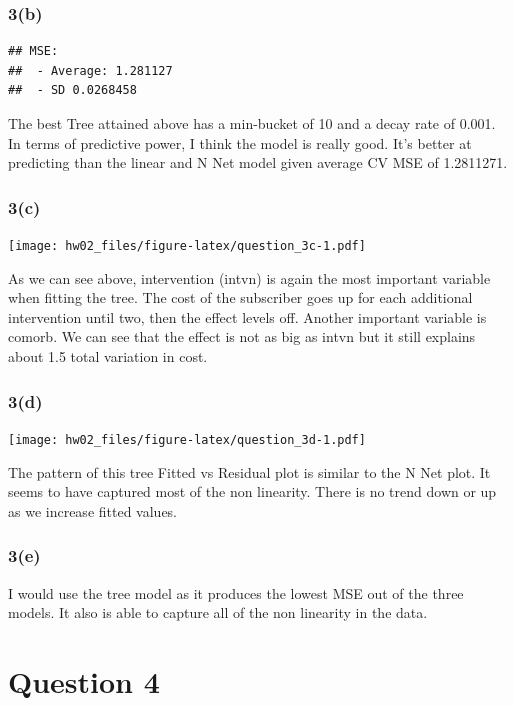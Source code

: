 \documentclass[
]{article}
\begin{document}
\hypertarget{b-2}{%
\subsubsection{3(b)}\label{b-2}}

\begin{verbatim}
## MSE: 
##  - Average: 1.281127 
##  - SD 0.0268458
\end{verbatim}

The best Tree attained above has a min-bucket of 10 and a decay rate of
0.001. In terms of predictive power, I think the model is really good.
It's better at predicting than the linear and N Net model given average
CV MSE of 1.2811271.

\hypertarget{c-2}{%
\subsubsection{3(c)}\label{c-2}}

\texttt{[image: hw02\_files/figure-latex/question\_3c-1.pdf]}

As we can see above, intervention (intvn) is again the most important
variable when fitting the tree. The cost of the subscriber goes up for
each additional intervention until two, then the effect levels off.
Another important variable is comorb. We can see that the effect is not
as big as intvn but it still explains about 1.5 total variation in cost.

\hypertarget{d-1}{%
\subsubsection{3(d)}\label{d-1}}

\texttt{[image: hw02\_files/figure-latex/question\_3d-1.pdf]}

The pattern of this tree Fitted vs Residual plot is similar to the N Net
plot. It seems to have captured most of the non linearity. There is no
trend down or up as we increase fitted values.

\hypertarget{e}{%
\subsubsection{3(e)}\label{e}}

I would use the tree model as it produces the lowest MSE out of the
three models. It also is able to capture all of the non linearity in the
data.

\hypertarget{question-4}{%
\section{Question 4}\label{question-4}}
\end{document}
